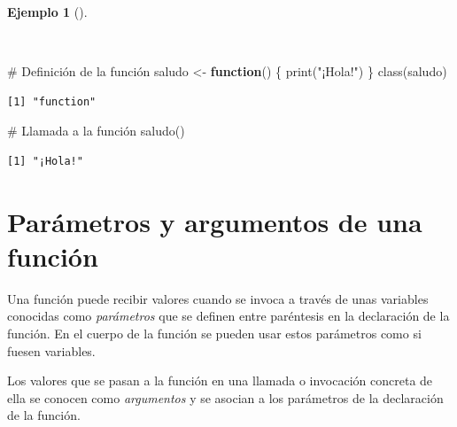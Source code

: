 \documentclass[
  spanish,
  a4paper,
]{scrreport}
\newenvironment{Shaded}{\begin{snugshade}}{\end{snugshade}}
\newcommand{\CommentTok}[1]{\textcolor[rgb]{0.37,0.37,0.37}{#1}}
\newcommand{\ControlFlowTok}[1]{\textcolor[rgb]{0.00,0.23,0.31}{\textbf{#1}}}
\newcommand{\FunctionTok}[1]{\textcolor[rgb]{0.28,0.35,0.67}{#1}}
\newcommand{\NormalTok}[1]{\textcolor[rgb]{0.00,0.23,0.31}{#1}}
\newcommand{\OtherTok}[1]{\textcolor[rgb]{0.00,0.23,0.31}{#1}}
\newcommand{\StringTok}[1]{\textcolor[rgb]{0.13,0.47,0.30}{#1}}
\theoremstyle{definition}
\theoremstyle{definition}
\newtheorem{example}{Ejemplo}[chapter]
\theoremstyle{remark}
\begin{document}
\begin{example}[]\protect\hypertarget{exm-creacion-funcion}{}\label{exm-creacion-funcion}

~

\begin{Shaded}
\begin{Highlighting}[]
\CommentTok{\# Definición de la función}
\NormalTok{saludo }\OtherTok{\textless{}{-}} \ControlFlowTok{function}\NormalTok{() \{}
  \FunctionTok{print}\NormalTok{(}\StringTok{"¡Hola!"}\NormalTok{)}
\NormalTok{\}}
\FunctionTok{class}\NormalTok{(saludo)}
\end{Highlighting}
\end{Shaded}

\begin{verbatim}
[1] "function"
\end{verbatim}

\begin{Shaded}
\begin{Highlighting}[]
\CommentTok{\# Llamada a la función}
\FunctionTok{saludo}\NormalTok{()}
\end{Highlighting}
\end{Shaded}

\begin{verbatim}
[1] "¡Hola!"
\end{verbatim}

\end{example}

\section{Parámetros y argumentos de una
función}\label{paruxe1metros-y-argumentos-de-una-funciuxf3n}

Una función puede recibir valores cuando se invoca a través de unas
variables conocidas como \emph{parámetros} que se definen entre
paréntesis en la declaración de la función. En el cuerpo de la función
se pueden usar estos parámetros como si fuesen variables.

Los valores que se pasan a la función en una llamada o invocación
concreta de ella se conocen como \emph{argumentos} y se asocian a los
parámetros de la declaración de la función.
\end{document}
